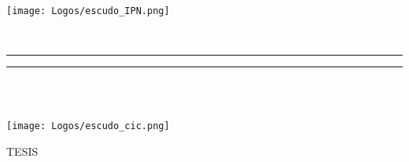 \begin{titlepage}
        \thispagestyle{empty}
        \begin{minipage}[c][0.17\textheight][c]{0.25\textwidth}
            \begin{center}
                \texttt{[image: Logos/escudo\_IPN.png]}
            \end{center}
        \end{minipage}
        \begin{minipage}[c][0.195\textheight][t]{0.75\textwidth}
            \begin{center}
                \vspace{0.3cm}
                \textsc{\large \univname}\\[0.5cm]
                \vspace{0.3cm}
                \hrule height2.5pt
                \vspace{.2cm}
                \hrule height1pt
                \vspace{.8cm}
                \textsc{\deptname }\\[0.5cm] %
            \end{center}
        \end{minipage}
        \begin{minipage}[c][0.81\textheight][t]{0.25\textwidth}
            \vspace*{5mm}
            \begin{center}
                \hskip2.0mm
                \vrule width1pt height13cm 
                \vspace{5mm}
                \hskip2pt
                \vrule width2.5pt height13cm
                \hskip2mm
                \vrule width1pt height13cm \\
                \vspace{5mm}
                \texttt{[image: Logos/escudo\_cic.png]}
            \end{center}
        \end{minipage}
        \begin{minipage}[c][0.81\textheight][t]{0.75\textwidth}
            \begin{center}
                \vspace{1cm}

                \textsc{\LARGE T\hspace{0.7cm}E\hspace{0.7cm}S\hspace{0.7cm}I\hspace{0.7cm}S}\\[0.5cm]
                {\large \ttitle}\\[.2in]


\end{center}
\end{minipage}
\end{titlepage}
